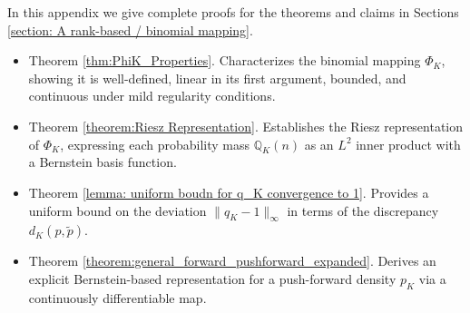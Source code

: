 \documentclass{article}
\begin{document}
In this appendix we give complete proofs for the theorems and claims in Sections \ref{section: A rank-based / binomial mapping}.
\begin{itemize}
  \item Theorem \ref{thm:PhiK_Properties}. Characterizes the binomial mapping 
    \(\Phi_{K}\), showing it is well-defined, linear in its first argument, bounded, and continuous under mild regularity conditions.
  \item Theorem \ref{theorem:Riesz Representation}. Establishes the Riesz representation of \(\Phi_{K}\), expressing each probability mass $\mathbb{Q}_{K}(n)$ as an \(L^{2}\) inner product with a Bernstein basis function.
  \item Theorem \ref{lemma: uniform boudn for q_K convergence to 1}. Provides a uniform bound on the deviation \(\|q_{K}-1\|_{\infty}\) in terms of the discrepancy \(d_{K}(p,\tilde p)\).
  \item Theorem \ref{theorem:general_forward_pushforward_expanded}. Derives an explicit Bernstein-based representation for a push-forward density \(p_K\) via a continuously differentiable map.
\end{itemize}
\end{document}
